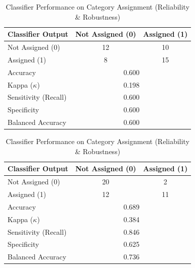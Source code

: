 \begin{table}[h!]
\begin{minipage}{0.48\textwidth}
\centering
\caption{Classifier Performance on Category Assignment (Abstract Harm)}
\label{tab:cm-abstract-harm}
\begin{tabular}{lcc}
\hline
\textbf{Classifier Output} & \textbf{Not Assigned (0)} & \textbf{Assigned (1)} \\
\hline
Not Assigned (0) & 12 & 10 \\
Assigned (1) & 8 & 15 \\
\hline
Accuracy & \multicolumn{2}{c}{0.600} \\
Kappa ($\kappa$) & \multicolumn{2}{c}{0.198} \\
Sensitivity (Recall) & \multicolumn{2}{c}{0.600} \\
Specificity & \multicolumn{2}{c}{0.600} \\
Balanced Accuracy & \multicolumn{2}{c}{0.600} \\
\hline
\end{tabular}
\end{minipage}
\hfill
\hfill
\begin{minipage}{0.48\textwidth}
\centering
\caption{Classifier Performance on Category Assignment (Reliability \& Robustness)}
\label{tab:cm-reliability-safety}
\begin{tabular}{lcc}
\hline
\textbf{Classifier Output} & \textbf{Not Assigned (0)} & \textbf{Assigned (1)} \\
\hline
Not Assigned (0) & 20 & 2 \\
Assigned (1) & 12 & 11 \\
\hline
Accuracy & \multicolumn{2}{c}{0.689} \\
Kappa ($\kappa$) & \multicolumn{2}{c}{0.384} \\
Sensitivity (Recall) & \multicolumn{2}{c}{0.846} \\
Specificity & \multicolumn{2}{c}{0.625} \\
Balanced Accuracy & \multicolumn{2}{c}{0.736} \\
\hline
\end{tabular}
\end{minipage}
\end{table}

